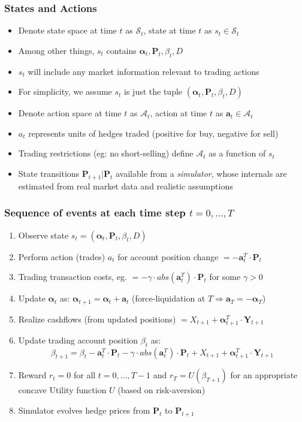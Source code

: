 \documentclass[handout]{beamer}
\begin{document}
\begin{frame}
\frametitle{States and Actions}
\pause
\begin{itemize}[<+->]
\item Denote state space at time $t$ as $\mathcal{S}_t$, state at time $t$ as $s_t \in \mathcal{S}_t$
\item Among other things, $s_t$ contains $\bm{\alpha}_t, \bm{P}_t, \beta_t, D$
\item $s_t$ will include any market information relevant to trading actions
\item For simplicity, we assume $s_t$ is just the tuple $(\bm{\alpha}_t, \bm{P}_t, \beta_t, D)$
\item Denote action space at time $t$ as $\mathcal{A}_t$, action at time $t$ as $\bm{a}_t \in \mathcal{A}_t$
\item $a_t$ represents units of hedges traded (positive for buy, negative for sell)
\item Trading restrictions (eg: no short-selling) define $\mathcal{A}_t$ as a function of $s_t$
\item State transitions $\bm{P}_{t+1}|\bm{P}_t$ available from a {\em simulator}, whose internals are estimated from real market data and realistic assumptions
\end{itemize}
\end{frame}

\begin{frame}
\frametitle{Sequence of events at each time step $t=0, \ldots, T$}
\pause
\begin{enumerate}[<+->]
\item Observe state $s_t = (\bm{\alpha}_t, \bm{P}_t, \beta_t, D)$
\item Perform action (trades) $a_t$ for account position change $= - \bm{a}_t^T \cdot \bm{P}_t$
\item Trading transaction costs, eg. $= - \gamma \cdot abs(\bm{a}_t^T) \cdot \bm{P}_t$ for some $\gamma > 0$
\item Update $\bm{\alpha}_t$ as: $\bm{\alpha}_{t+1} = \bm{\alpha}_t + \bm{a}_t$ (force-liquidation at $T \Rightarrow \bm{a}_T= -\bm{\alpha}_T$)
\item Realize cashflows (from updated positions) $=X_{t+1} + \bm{\alpha}_{t+1}^T \cdot \bm{Y}_{t+1}$
\item Update trading account position $\beta_t$ as:
$$\beta_{t+1} = \beta_t - \bm{a}_t^T \cdot \bm{P}_t - \gamma \cdot abs(\bm{a}_t^T) \cdot \bm{P}_t + X_{t+1} + \bm{\alpha}_{t+1}^T \cdot \bm{Y}_{t+1}$$
\item Reward $r_t = 0$ for all $t = 0, \ldots, T-1$ and $r_T = U(\beta_{T+1})$ for an appropriate concave Utility function $U$ (based on risk-aversion)
\item Simulator evolves hedge prices from $\bm{P}_t$ to $\bm{P}_{t+1}$
\end{enumerate}
\end{frame}
\end{document}
